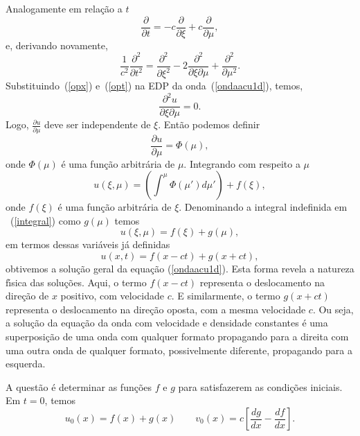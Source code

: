 Analogamente em rela\c{c}\~ao a $t$
\begin{equation}
 \frac{\partial}{\partial t}=-c\frac{\partial}{\partial \xi}+c\frac{\partial}{\partial \mu},
\end{equation}
e, derivando novamente,
\begin{equation}\label{opt}
 \frac{1}{c^2}\frac{\partial ^2}{\partial t^2}=\frac{\partial ^2}
{\partial \xi  ^2}-2\frac{\partial ^2}{\partial \xi \partial \mu}+\frac{\partial ^2}
{\partial \mu ^2}.
\end{equation}
Substituindo~(\ref{opx}) e~(\ref{opt}) na EDP da onda~(\ref{ondaacu1d}), temos,
\begin{equation}
 \frac{\partial ^2u}{\partial \xi \partial \mu}=0.
\end{equation}
Logo, $\frac{\partial u}{\partial \mu}$ deve ser independente de $\xi$. Ent\~ao podemos 
definir
\begin{equation}
 \frac{\partial u}{\partial \mu}=\Phi (\mu),
\end{equation}
onde $\Phi (\mu)$ \'e uma fun\c{c}\~ao arbitr\'aria de $\mu$. Integrando com respeito a $\mu$
\begin{equation}\label{integral}
 u(\xi,\mu)=(\int^\mu \Phi (\mu ')d\mu ')+f(\xi),
\end{equation}
onde $f(\xi)$ \'e uma fun\c{c}\~ao arbitr\'aria de $\xi$.  Denominando a integral indefinida 
em ~(\ref{integral}) como $g(\mu )$ temos
\begin{equation}
 u(\xi,\mu)=f(\xi)+g(\mu),
\end{equation}
em termos dessas vari\'aveis j\'a definidas
\begin{equation}\label{peqonda}
 u(x,t)=f(x-ct)+g(x+ct),
\end{equation}
obtivemos a solu\c{c}\~ao geral da equa\c{c}\~ao (\ref{ondaacu1d}). Esta
forma revela a natureza f\'{\i}sica das solu\c{c}\~oes. Aqui, o termo
$f(x-ct)$ representa o deslocamento na dire\c{c}\~ao de $x$ positivo,
com velocidade $c$. E similarmente, o termo $g(x+ct)$ representa o
deslocamento na dire\c{c}\~ao oposta, com a mesma velocidade $c$. Ou
seja, a solu\c{c}\~ao da equa\c{c}\~ao da onda com velocidade e
densidade constantes \'e uma superposi\c{c}\~ao de uma onda com qualquer
formato propagando para a direita com uma outra onda de qualquer
formato, possivelmente diferente, propagando para a esquerda.

A quest\~ao \'e determinar as fun\c{c}\~oes $f$ e $g$ para satisfazerem
as condi\c{c}\~oes iniciais. Em $t=0$, temos
\begin{equation}
 u_0 (x)=f(x)+g(x)    \qquad   v_0 (x)=c\left[\frac{dg}{dx}-\frac{df}{dx}\right].
 \label{condini}
\end{equation}

